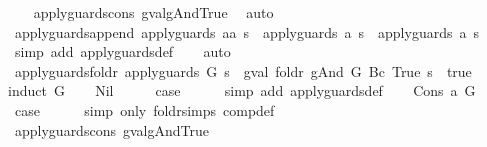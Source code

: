 \begin{isabellebody}
%
\isadelimproof
\ \ %
\endisadelimproof
%
\isatagproof
{}\isamarkupfalse%
\ apply{\isacharunderscore}guards{\isacharunderscore}cons\ gval{\isacharunderscore}gAnd{\isacharunderscore}True\ \isamarkupfalse%
\ auto%
\endisatagproof
{\isafoldproof}%
%
\isadelimproof
\isanewline
%
\endisadelimproof
\isanewline
{}\isamarkupfalse%
\ apply{\isacharunderscore}guards{\isacharunderscore}append{\isacharcolon}\ {\isachardoublequoteopen}apply{\isacharunderscore}guards\ {\isacharparenleft}a{\isacharat}a{\isacharprime}{\isacharparenright}\ s\ {\isacharequal}\ {\isacharparenleft}apply{\isacharunderscore}guards\ a\ s\ {\isasymand}\ apply{\isacharunderscore}guards\ a{\isacharprime}\ s{\isacharparenright}{\isachardoublequoteclose}\isanewline
%
\isadelimproof
\ \ %
\endisadelimproof
%
\isatagproof
{}\isamarkupfalse%
\ {\isacharparenleft}simp\ add{\isacharcolon}\ apply{\isacharunderscore}guards{\isacharunderscore}def{\isacharparenright}\isanewline
\ \ \isamarkupfalse%
\ auto%
\endisatagproof
{\isafoldproof}%
%
\isadelimproof
\isanewline
%
\endisadelimproof
\isanewline
{}\isamarkupfalse%
\ apply{\isacharunderscore}guards{\isacharunderscore}foldr{\isacharcolon}\ {\isachardoublequoteopen}apply{\isacharunderscore}guards\ G\ s\ {\isacharequal}\ {\isacharparenleft}gval\ {\isacharparenleft}foldr\ gAnd\ G\ {\isacharparenleft}Bc\ True{\isacharparenright}{\isacharparenright}\ s\ {\isacharequal}\ true{\isacharparenright}{\isachardoublequoteclose}\isanewline
%
\isadelimproof
%
\endisadelimproof
%
\isatagproof
{}\isamarkupfalse%
{\isacharparenleft}induct\ G{\isacharparenright}\isanewline
\ \ \isamarkupfalse%
\ Nil\isanewline
\ \ \isamarkupfalse%
\ \isamarkupfalse%
\ {\isacharquery}case\isanewline
\ \ \ \ \isamarkupfalse%
\ {\isacharparenleft}simp\ add{\isacharcolon}\ apply{\isacharunderscore}guards{\isacharunderscore}def{\isacharparenright}\isanewline
{}\isamarkupfalse%
\isanewline
\ \ \isamarkupfalse%
\ {\isacharparenleft}Cons\ a\ G{\isacharparenright}\isanewline
\ \ \isamarkupfalse%
\ \isamarkupfalse%
\ {\isacharquery}case\isanewline
\ \ \ \ \isamarkupfalse%
\ {\isacharparenleft}simp\ only{\isacharcolon}\ foldr{\isachardot}simps\ comp{\isacharunderscore}def{\isacharparenright}\isanewline
\ \ \ \ \isamarkupfalse%
\ apply{\isacharunderscore}guards{\isacharunderscore}cons\ gval{\isacharunderscore}gAnd{\isacharunderscore}True\ \isamarkupfalse%

\end{isabellebody}
